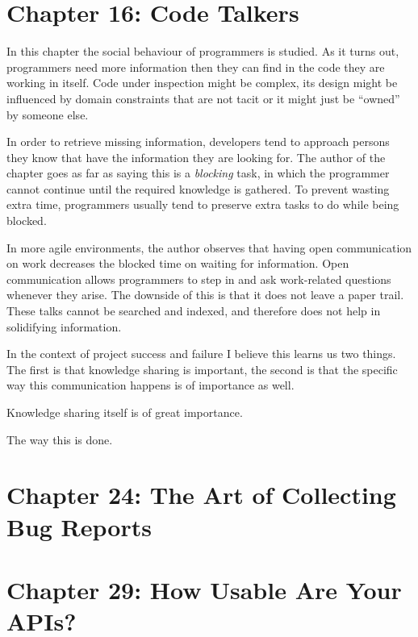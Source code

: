 \documentclass[]{uva-bachelor-thesis}
\def \CurrChapter {}
\def \CurrSection {}
\renewcommand{\chaptermark}[1]{\def \CurrChapter {#1} \def \CurrSection {}}
\begin{document}
\chapter{Chapter 16: Code Talkers \cite{makingsoftware}}
In this chapter the social behaviour of programmers is studied.
As it turns out, programmers need more information then they can find in the code they are working in itself. 
Code under inspection might be complex, its design might be influenced by domain constraints that are not tacit or it might just be ``owned'' by someone else.

In order to retrieve missing information, developers tend to approach persons they know that have the information they are looking for. 
The author of the chapter goes as far as saying this is a \emph{blocking} task, in which the programmer cannot continue until the required knowledge is gathered. 
To prevent wasting extra time, programmers usually tend to preserve extra tasks to do while being blocked.

In more agile environments, the author observes that having open communication on work decreases the blocked time on waiting for information.
Open communication allows programmers to step in and ask work-related questions whenever they arise.
The downside of this is that it does not leave a paper trail. 
These talks cannot be searched and indexed, and therefore does not help in solidifying information.

In the context of project success and failure I believe this learns us two things. 
The first is that knowledge sharing is important, the second is that the specific way this communication happens is of importance as well.

Knowledge sharing itself is of great importance. 

The way this is done.

\chapter{Chapter 24: The Art of Collecting Bug Reports \cite{makingsoftware}}

\chapter{Chapter 29: How Usable Are Your APIs? \cite{makingsoftware}}



\chaptermark{Bibliography}
\end{document}
